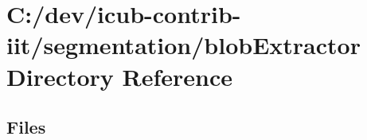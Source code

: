 \section{C\+:/dev/icub-\/contrib-\/iit/segmentation/blob\+Extractor Directory Reference}
\label{dir_5b345e0d467a62e18599f41843cc1c9c}
\subsection*{Files}
\begin{DoxyCompactItemize}
\end{DoxyCompactItemize}
